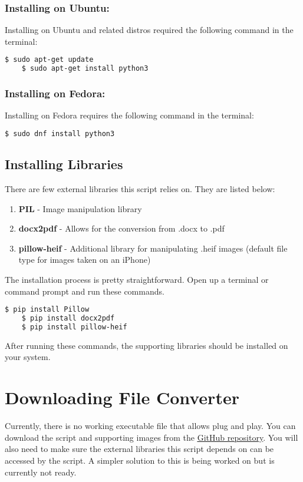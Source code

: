 \documentclass[
	a4paper, %
	12pt, %
]{CSSullivanBusinessReport}
\begin{document}
\begin{fullwidth}
\subsubsection{Installing on Ubuntu:}
Installing on Ubuntu and related distros required the following command in the terminal:
\begin{lstlisting}[language=bash]
	$ sudo apt-get update
	$ sudo apt-get install python3
\end{lstlisting}

\subsubsection{Installing on Fedora:}
Installing on Fedora requires the following command in the terminal:
\begin{lstlisting}[language=bash]
	$ sudo dnf install python3
\end{lstlisting}

\subsection{Installing Libraries}
There are few external libraries this script relies on. They are listed below:
\begin{enumerate}
	\item \textbf{PIL} - Image manipulation library
	\item \textbf{docx2pdf} - Allows for the conversion from .docx to .pdf
	\item	\textbf{pillow-heif} - Additional library for manipulating .heif images (default file type for images taken on an iPhone)
\end{enumerate}

The installation process is pretty straightforward. Open up a terminal or command prompt and run these commands.

\begin{lstlisting}[language=bash]
	$ pip install Pillow
	$ pip install docx2pdf
	$ pip install pillow-heif
\end{lstlisting}

After running these commands, the supporting libraries should be installed on your system.

\section{Downloading File Converter}
Currently, there is no working executable file that allows plug and play. You can download the script and supporting images from the \href{https://github.com/MaybeMarq/File-Converter}{\underline{GitHub repository}}. You will also need to make sure the external libraries this script depends on can be accessed by the script. A simpler solution to this is being worked on but is currently not ready. 


\end{fullwidth}
\end{document}
